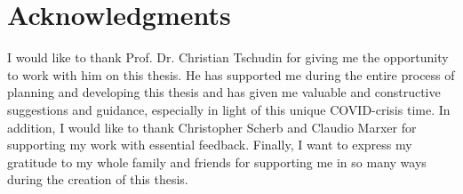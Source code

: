 \chapter{Acknowledgments}
I would like to thank Prof. Dr. Christian Tschudin for giving me the opportunity to work with him on this thesis. He has supported me during the entire process of planning and developing this thesis and has given me valuable and constructive suggestions and guidance, especially in light of this unique COVID-crisis time. In addition, I would like to thank Christopher Scherb and Claudio Marxer for supporting my work with essential feedback. Finally, I want to express my gratitude to my whole family and friends for supporting me in so many ways during the creation of this thesis.
